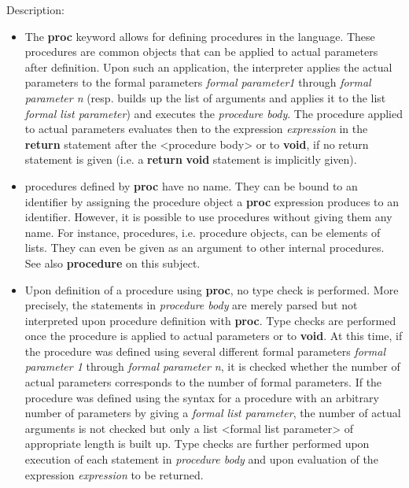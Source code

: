 \noindent Description: \begin{itemize}

\item The \textbf{proc} keyword allows for defining procedures in the \sollya
   language. These procedures are common \sollya objects that can be
   applied to actual parameters after definition. Upon such an
   application, the \sollya interpreter applies the actual parameters to
   the formal parameters \emph{formal parameter1} through \emph{formal parameter n}
   (resp. builds up the list of arguments and applies it to the list
   \emph{formal list parameter}) and executes the \emph{procedure body}. The
   procedure applied to actual parameters evaluates then to the
   expression \emph{expression} in the \textbf{return} statement after the <procedure
   body> or to \textbf{void}, if no return statement is given (i.e. a \textbf{return}
   \textbf{void} statement is implicitly given).

\item \sollya procedures defined by \textbf{proc} have no name. They can be bound
   to an identifier by assigning the procedure object a \textbf{proc}
   expression produces to an identifier. However, it is possible to use
   procedures without giving them any name. For instance, \sollya
   procedures, i.e. procedure objects, can be elements of lists. They can
   even be given as an argument to other internal \sollya procedures. See
   also \textbf{procedure} on this subject.

\item Upon definition of a \sollya procedure using \textbf{proc}, no type check
   is performed. More precisely, the statements in \emph{procedure body} are
   merely parsed but not interpreted upon procedure definition with
   \textbf{proc}. Type checks are performed once the procedure is applied to
   actual parameters or to \textbf{void}. At this time, if the procedure was
   defined using several different formal parameters \emph{formal parameter 1}
   through \emph{formal parameter n}, it is checked whether the number of
   actual parameters corresponds to the number of formal parameters. If
   the procedure was defined using the syntax for a procedure with an
   arbitrary number of parameters by giving a \emph{formal list parameter},
   the number of actual arguments is not checked but only a list <formal
   list parameter> of appropriate length is built up. Type checks are
   further performed upon execution of each statement in \emph{procedure body}
   and upon evaluation of the expression \emph{expression} to be returned.
    

\end{itemize}
